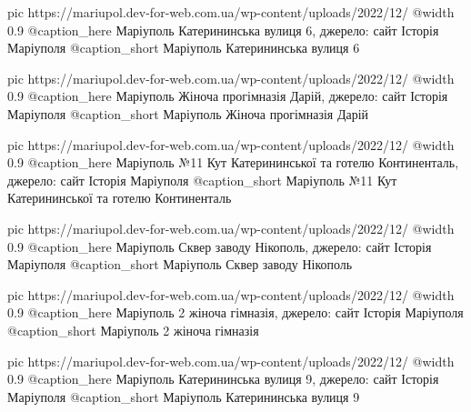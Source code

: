 	pic https://mariupol.dev-for-web.com.ua/wp-content/uploads/2022/12/%
	@width 0.9
	@caption_here Маріуполь Катерининська вулиця 6, джерело: сайт Історія Маріуполя
	@caption_short Маріуполь Катерининська вулиця 6

	pic https://mariupol.dev-for-web.com.ua/wp-content/uploads/2022/12/%
	@width 0.9
	@caption_here Маріуполь Жіноча прогімназія Дарій, джерело: сайт Історія Маріуполя
	@caption_short Маріуполь Жіноча прогімназія Дарій

	pic https://mariupol.dev-for-web.com.ua/wp-content/uploads/2022/12/%
	@width 0.9
	@caption_here Маріуполь №11 Кут Катерининської та готелю Континенталь, джерело: сайт Історія Маріуполя
	@caption_short Маріуполь №11 Кут Катерининської та готелю Континенталь

	pic https://mariupol.dev-for-web.com.ua/wp-content/uploads/2022/12/%
	@width 0.9
	@caption_here Маріуполь Сквер заводу Нікополь, джерело: сайт Історія Маріуполя
	@caption_short Маріуполь Сквер заводу Нікополь

	pic https://mariupol.dev-for-web.com.ua/wp-content/uploads/2022/12/%
	@width 0.9
	@caption_here Маріуполь 2 жіноча гімназія, джерело: сайт Історія Маріуполя
	@caption_short Маріуполь 2 жіноча гімназія

	pic https://mariupol.dev-for-web.com.ua/wp-content/uploads/2022/12/%
	@width 0.9
	@caption_here Маріуполь Катерининська вулиця 9, джерело: сайт Історія Маріуполя
	@caption_short Маріуполь Катерининська вулиця 9

